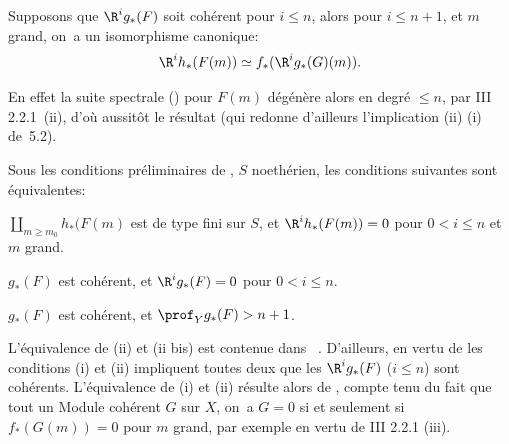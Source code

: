 \begin{corollaire} \label{XII.5.4}
Supposons que $\R^ig_\ast(F)$ soit coh\'erent pour $i\leq n$, alors pour $i\leq n+1$, et $m$ grand, on~a un isomorphisme canonique:
\[
\R^ih_\ast(F(m)) \simeq f_\ast(\R^ig_\ast(G)(m)).
\]
\end{corollaire}

En effet la suite spectrale () pour $F(m)$ d\'eg\'en\`ere alors en degr\'e $\leq n$, par \EGA III 2.2.1~(ii), d'o\`u aussit\^{o}t le r\'esultat (qui redonne d'ailleurs l'implication (ii) \ALORS (i) de~5.2).

\enlargethispage{1.2\baselineskip}%
\begin{corollaire} \label{XII.5.5}
Sous les conditions pr\'eliminaires de , $S$ noeth\'erien, les conditions suivantes sont \'equivalentes:
\begin{enumeratei}
\item
$\coprod_{m\geq m_0}h_\ast(F(m)$ est de type fini sur $S$, et $\R^ih_\ast(F(m))=0$ pour $0<i\leq n$ et $m$ grand.
\item
$g_\ast(F)$ est coh\'erent, et $\R^ig_\ast(F)=0$ pour $0<i\leq n$.
\item[\textup{(ii bis)}] $g_\ast(F)$ est coh\'erent, et $\prof_Y g_\ast(F)>n+1$.
\end{enumeratei}
\end{corollaire}

L'\'equivalence de (ii) et (ii bis) est contenue dans ~. D'ailleurs, en vertu de  les conditions (i) et (ii) impliquent toutes deux que les $\R^ig_\ast(F)$ ($i\leq n$) sont coh\'erents. L'\'equivalence de (i) et (ii) r\'esulte alors de , compte tenu du fait que tout un Module coh\'erent $G$ sur $X$, on~a $G=0$ si et seulement si $f_\ast(G(m))=0$ pour $m$ grand, par exemple en vertu de \EGA III 2.2.1 (iii).

